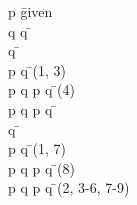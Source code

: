 \documentclass{article}
\begin{document}
\begin{proofbox}
\: p \= \hbox{given} \\
\: q \lor \lnot q \= \lem \\
\openAlt
\: q \= \asm \\
\: p \land q \= \andintro(1, 3) \\
\: p \land q \lor p \land \lnot q \= \orintro(4) \\
\: p \land q \lor p \land \lnot q \=  \\
\splitAlt
\: \lnot q \= \asm \\
\: p \land \lnot q \= \andintro(1, 7) \\
\: p \land q \lor p \land \lnot q \= \orintro(8) \\
\closeAlt
\: p \land q \lor p \land \lnot q \= \orelim(2, 3-6, 7-9) \\
\end{proofbox}
\end{document}
